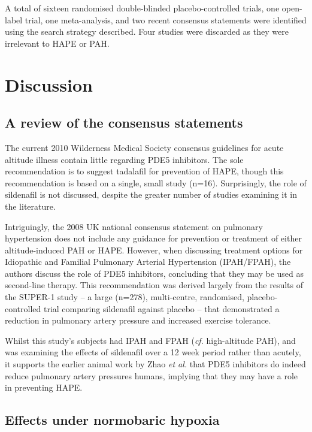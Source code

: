 \documentclass[12pt,a4paper]{article}
\begin{document}
A total of sixteen randomised double-blinded placebo-controlled trials, one open-label trial, one meta-analysis, and two recent consensus statements were identified using the search strategy described. Four studies were discarded as they were irrelevant to HAPE or PAH.

\section*{Discussion}

\subsection*{A review of the consensus statements}

The current 2010 Wilderness Medical Society consensus guidelines for acute altitude illness contain little regarding PDE5 inhibitors.\cite{Luks:2010ht} The sole recommendation is to suggest tadalafil for prevention of HAPE, though this recommendation is based on a single, small study (n=16).\cite{Maggiorini:2006kz} Surprisingly, the role of sildenafil is not discussed, despite the greater number of studies examining it in the literature.

Intriguingly, the 2008 UK national consensus statement on pulmonary hypertension does not include any guidance for prevention or treatment of either altitude-induced PAH or HAPE.\cite{NationalPulmonaryHypertensionCentresoftheUKandIreland:2008jh} However, when discussing treatment options for Idiopathic and Familial Pulmonary Arterial Hypertension (IPAH/FPAH), the authors discuss the role of PDE5 inhibitors, concluding that they may be used as second-line therapy. This recommendation was derived largely from the results of the SUPER-1 study -- a large (n=278), multi-centre, randomised, placebo-controlled trial comparing sildenafil against placebo -- that demonstrated a reduction in pulmonary artery pressure and increased exercise tolerance.\cite{Galie:2005gx}

Whilst this study's subjects had IPAH and FPAH (\emph{cf.} high-altitude PAH), and was examining the effects of sildenafil over a 12 week period rather than acutely, it supports the earlier animal work by Zhao \emph{et al.}\cite{Zhao:2001kj} that PDE5 inhibitors do indeed reduce pulmonary artery pressures humans, implying that they may have a role in preventing HAPE.

\subsection*{Effects under normobaric hypoxia}
\end{document}

